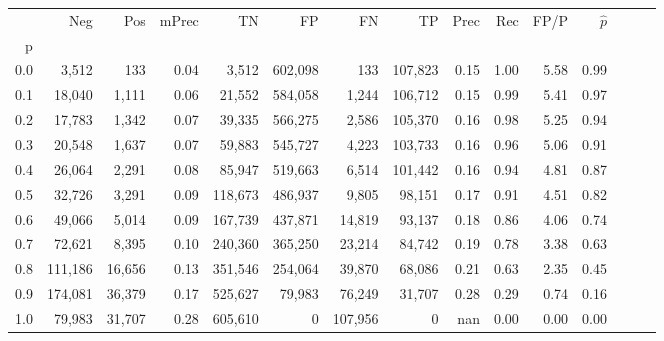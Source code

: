 \begin{tabular}{rrrrrrrrrrrrrrr}
\toprule
{} &      Neg &     Pos & mPrec &       TN &       FP &       FN &       TP &  Prec &   Rec &  FP/P & $\hat{p}$ \\
p   &          &         &       &          &          &          &          &       &       &       &           \\
\midrule
0.0 &    3,512 &     133 &  0.04 &    3,512 &  602,098 &      133 &  107,823 &  0.15 &  1.00 &  5.58 &      0.99 \\
0.1 &   18,040 &   1,111 &  0.06 &   21,552 &  584,058 &    1,244 &  106,712 &  0.15 &  0.99 &  5.41 &      0.97 \\
0.2 &   17,783 &   1,342 &  0.07 &   39,335 &  566,275 &    2,586 &  105,370 &  0.16 &  0.98 &  5.25 &      0.94 \\
0.3 &   20,548 &   1,637 &  0.07 &   59,883 &  545,727 &    4,223 &  103,733 &  0.16 &  0.96 &  5.06 &      0.91 \\
0.4 &   26,064 &   2,291 &  0.08 &   85,947 &  519,663 &    6,514 &  101,442 &  0.16 &  0.94 &  4.81 &      0.87 \\
0.5 &   32,726 &   3,291 &  0.09 &  118,673 &  486,937 &    9,805 &   98,151 &  0.17 &  0.91 &  4.51 &      0.82 \\
0.6 &   49,066 &   5,014 &  0.09 &  167,739 &  437,871 &   14,819 &   93,137 &  0.18 &  0.86 &  4.06 &      0.74 \\
0.7 &   72,621 &   8,395 &  0.10 &  240,360 &  365,250 &   23,214 &   84,742 &  0.19 &  0.78 &  3.38 &      0.63 \\
0.8 &  111,186 &  16,656 &  0.13 &  351,546 &  254,064 &   39,870 &   68,086 &  0.21 &  0.63 &  2.35 &      0.45 \\
0.9 &  174,081 &  36,379 &  0.17 &  525,627 &   79,983 &   76,249 &   31,707 &  0.28 &  0.29 &  0.74 &      0.16 \\
1.0 &   79,983 &  31,707 &  0.28 &  605,610 &        0 &  107,956 &        0 &   nan &  0.00 &  0.00 &      0.00 \\
\bottomrule
\end{tabular}
